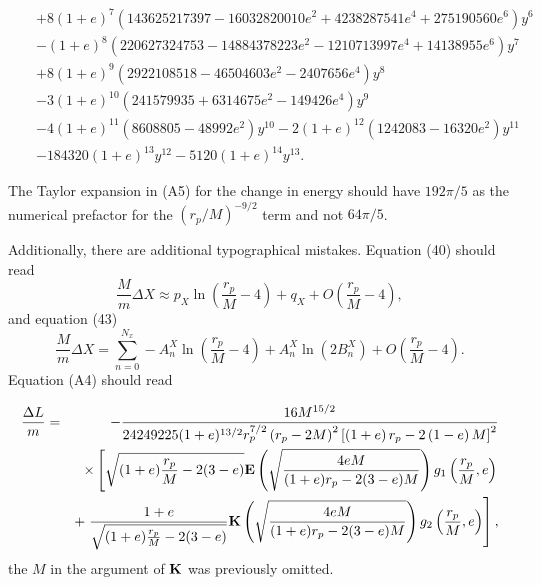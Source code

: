 \documentclass[aps,prd,amsfonts,amssymb,amsmath,nofootinbib,reprint,showpacs]{revtex4-1}
\begin{document}
\begin{widetext}
\begin{eqnarray}
 & & + \left. 8 (1+e)^7 \left(143625217397-16032820010 e^2+4238287541 e^4+275190560 e^6\right) y^6 \right. \nonumber \\
 & & - \left. (1+e)^8 \left(220627324753-14884378223 e^2-1210713997 e^4+14138955 e^6\right) y^7 \right. \nonumber \\
 & & + \left. 8 (1+e)^9 \left(2922108518-46504603 e^2-2407656 e^4\right) y^8 \right. \nonumber \\
 & & - \left. 3 (1+e)^{10} \left(241579935+6314675 e^2-149426 e^4\right) y^9 \right. \nonumber \\
 & & - \left. 4 (1+e)^{11} \left(8608805-48992 e^2\right) y^{10}-2 (1+e)^{12} \left(1242083-16320 e^2\right) y^{11} \right. \nonumber \\
 & & - \left. 184320 (1+e)^{13} y^{12}-5120 (1+e)^{14} y^{13}\right..
\end{eqnarray}
\end{widetext}
The Taylor expansion in (A5) for the change in energy should have $192\pi/5$ as the numerical prefactor for the $(r_p/M)^{-9/2}$ term and not $64\pi/5$.

Additionally, there are additional typographical mistakes. Equation (40) should read
\begin{equation}
\frac{M}{m}\Delta X \approx p_X\ln\left(\frac{r_p}{M} - 4\right) + q_X + O\left(\frac{r_p}{M} - 4\right),
\end{equation}
and equation (43)
\begin{equation}
\frac{M}{m}\Delta X = \sum_{n=0}^{N_x}-A^X_n\ln\left(\frac{r_p}{M} - 4\right) + A^X_n\ln(2B^X_n)+ O\left(\frac{r_p}{M} - 4\right).
\end{equation}
Equation (A4) should read
\begin{widetext}
\begin{eqnarray}
\frac{\Delta L}{m} & = & - \frac{16 M^{15/2}}{24249225(1+e)^{13/2}r_p^{7/2}\left(r_p-2M\right)^2\left[\left(1+e\right)r_p-2\left(1-e\right)M\right]^2} \nonumber \\
 & & \times {} \left[ \sqrt{(1+e)\frac{r_p}{M}-2(3-e)} {\bf{E}}\left(\sqrt{\frac{4eM}{(1+e)r_p-2(3-e)M}}\right)g_1\left(\frac{r_p}{M},e\right) \right. \nonumber \\
 & & + \left. \frac{1+e}{\sqrt{(1+e)\frac{r_p}{M}-2(3-e)}} {\bf{K}}\left(\sqrt{\frac{4eM}{(1+e)r_p-2(3-e)M}}\right)g_2\left(\frac{r_p}{M},e\right)\right],
\end{eqnarray}
the $M$ in the argument of $\bf{K}$ was previously omitted.
\end{widetext}
\end{document}
